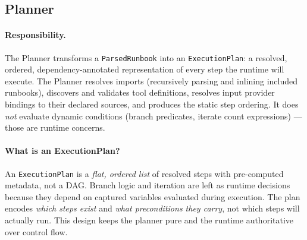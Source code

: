 \subsection{Planner}

\paragraph{Responsibility.}
The Planner transforms a \texttt{ParsedRunbook} into an \texttt{ExecutionPlan}: a resolved, ordered,
dependency-annotated representation of every step the runtime will execute. The Planner resolves imports
(recursively parsing and inlining included runbooks), discovers and validates tool definitions, resolves
input provider bindings to their declared sources, and produces the static step ordering. It does
\emph{not} evaluate dynamic conditions (branch predicates, iterate count expressions) — those are
runtime concerns.

\paragraph{What is an ExecutionPlan?}
An \texttt{ExecutionPlan} is a \emph{flat, ordered list} of resolved steps with pre-computed metadata,
not a DAG. Branch logic and iteration are left as runtime decisions because they depend on captured
variables evaluated during execution. The plan encodes \emph{which steps exist} and \emph{what
preconditions they carry}, not which steps will actually run. This design keeps the planner pure and
the runtime authoritative over control flow.

